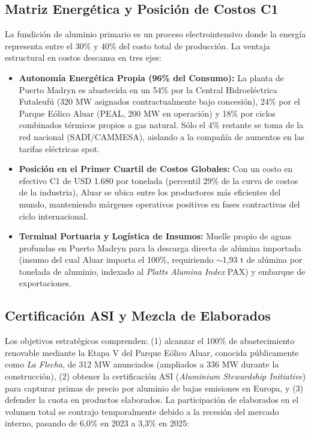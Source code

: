 \documentclass[11pt,a4paper]{article}
\begin{document}
\subsection{Matriz Energética y Posición de Costos C1}
La fundición de aluminio primario es un proceso electrointensivo donde la energía representa entre el 30\% y 40\% del costo total de producción. La ventaja estructural en costos descansa en tres ejes:
\begin{itemize}
    \item \textbf{Autonomía Energética Propia (96\% del Consumo):} La planta de Puerto Madryn es abastecida en un 54\% por la Central Hidroeléctrica Futaleufú (320 MW asignados contractualmente bajo concesión), 24\% por el Parque Eólico Aluar (PEAL, 200 MW en operación) y 18\% por ciclos combinados térmicos propios a gas natural. Sólo el 4\% restante se toma de la red nacional (SADI/CAMMESA), aislando a la compañía de aumentos en las tarifas eléctricas spot.
    \item \textbf{Posición en el Primer Cuartil de Costos Globales:} Con un costo en efectivo C1 de USD 1.680 por tonelada (percentil 29\% de la curva de costos de la industria), Aluar se ubica entre los productores más eficientes del mundo, manteniendo márgenes operativos positivos en fases contractivas del ciclo internacional.
    \item \textbf{Terminal Portuaria y Logística de Insumos:} Muelle propio de aguas profundas en Puerto Madryn para la descarga directa de alúmina importada (insumo del cual Aluar importa el 100\%, requiriendo $\sim$1,93 t de alúmina por tonelada de aluminio, indexado al \textit{Platts Alumina Index} PAX) y embarque de exportaciones.
\end{itemize}

\subsection{Certificación ASI y Mezcla de Elaborados}
Los objetivos estratégicos comprenden: (1) alcanzar el 100\% de abastecimiento renovable mediante la Etapa V del Parque Eólico Aluar, conocida públicamente como \emph{La Flecha}, de 312 MW anunciados (ampliados a 336 MW durante la construcción), (2) obtener la certificación ASI (\emph{Aluminium Stewardship Initiative}) para capturar primas de precio por aluminio de bajas emisiones en Europa, y (3) defender la cuota en productos elaborados. La participación de elaborados en el volumen total se contrajo temporalmente debido a la recesión del mercado interno, pasando de 6,0\% en 2023 a 3,3\% en 2025:
\end{document}
